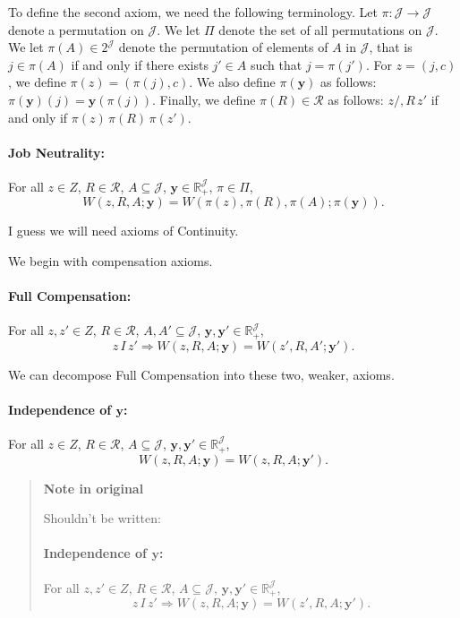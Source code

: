 \documentclass[12pt,thmsb]{article}
\begin{document}
To define the second axiom, we need the following terminology. Let $\pi:\mathcal{J}\rightarrow \mathcal{J}$ denote a permutation on $\mathcal{J}$. We let $\Pi$ denote the set of all permutations on $\mathcal{J}$. We let $\pi(A)\in 2^{\mathcal{J}}$ denote the permutation of elements of $A$ in $\mathcal{J}$, that is $j\in\pi(A)$ if and only if there exists $j'\in A$ such that $j=\pi(j')$. For $z=(j,c)$, we define $\pi(z)=(\pi(j),c)$. We also define $\pi(\mathbf{y})$ as follows: $\pi(\mathbf{y})(j)=\mathbf{y}(\pi(j))$. Finally, we define $\pi(R)\in\mathcal{R}$ as follows: $z/,R\,z'$ if and only if $\pi(z)\,\pi(R)\,\pi(z')$.

\paragraph{Job Neutrality:} For all $z\in Z$, $R\in \mathcal{R}$, $A\subseteq \mathcal{J}$, $\mathbf{y}\in \mathbb{R}_{+}^{\mathcal{J}}$, $\pi\in\Pi$,
\begin{equation*}
W(z,R,A;\mathbf{y})=W(\pi(z),\pi(R),\pi(A);\pi(\mathbf{y})).
\end{equation*}

I guess we will need axioms of Continuity.

We begin with compensation axioms.

\paragraph{Full Compensation:} For all $z,z'\in Z$, $R\in \mathcal{R}$, $A,A'\subseteq \mathcal{J}$, $\mathbf{y}, \mathbf{y}' \in \mathbb{R}_{+}^{\mathcal{J}}$,
\begin{equation*}
z\,I\,z' \Rightarrow W(z,R,A;\mathbf{y})=W(z',R,A';\mathbf{y}').
\end{equation*}

We can decompose Full Compensation into these two, weaker, axioms.

\paragraph{Independence of $\mathbf{y}$:} For all $z\in Z$, $R\in \mathcal{R}$, $A\subseteq \mathcal{J}$, $\mathbf{y}, \mathbf{y}' \in \mathbb{R}_{+}^{\mathcal{J}}$,
\begin{equation*}
W(z,R,A;\mathbf{y})=W(z,R,A;\mathbf{y}').
\end{equation*}

\begin{quote}
\textbf{Note in original}

Shouldn't be written:

\paragraph{Independence of $\mathbf{y}$:} For all $z,z'\in Z$, $R\in \mathcal{R}$, $A\subseteq \mathcal{J}$, $\mathbf{y}, \mathbf{y}' \in \mathbb{R}_{+}^{\mathcal{J}}$,
\begin{equation*}
z\,I\,z' \Rightarrow W(z,R,A;\mathbf{y})=W(z',R,A;\mathbf{y'}).
\end{equation*}
\end{quote}
\end{document}

